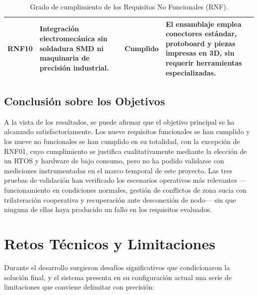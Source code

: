 \begin{table}[H]
{\begin{tabular}{p{1.5cm} p{5cm} p{2.2cm} p{7cm}}
        \addlinespace
        \textbf{RNF10} & Integración electromecánica sin soldadura SMD ni maquinaria de precisión industrial. & Cumplido & El ensamblaje emplea conectores estándar, protoboard y piezas impresas en 3D, sin requerir herramientas especializadas. \\
        \bottomrule
    \end{tabular}
}
\caption{Grado de cumplimiento de los Requisitos No Funcionales (RNF).}
\label{tab:cumplimiento_rnf}
\end{table}

\subsection{Conclusión sobre los Objetivos}

A la vista de los resultados, se puede afirmar que el objetivo principal se ha alcanzado satisfactoriamente. Los nueve requisitos funcionales se han cumplido y los nueve no funcionales se han cumplido en su totalidad, con la excepción de RNF01, cuyo cumplimiento se justifica cualitativamente mediante la elección de un RTOS y hardware de bajo consumo, pero no ha podido validarse con mediciones instrumentadas en el marco temporal de este proyecto. Las tres pruebas de validación han verificado los escenarios operativos más relevantes ---funcionamiento en condiciones normales, gestión de conflictos de zona sucia con trilateración cooperativa y recuperación ante desconexión de nodo--- sin que ninguna de ellas haya producido un fallo en los requisitos evaluados.

\section{Retos Técnicos y Limitaciones}

Durante el desarrollo surgieron desafíos significativos que condicionaron la solución final, y el sistema presenta en su configuración actual una serie de limitaciones que conviene delimitar con precisión:

